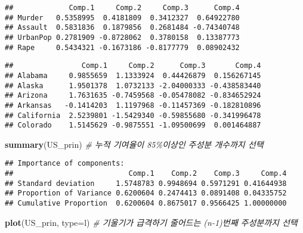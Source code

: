 \documentclass[
]{article}
\newenvironment{Shaded}{\begin{snugshade}}{\end{snugshade}}
\newcommand{\AttributeTok}[1]{\textcolor[rgb]{0.13,0.29,0.53}{#1}}
\newcommand{\CommentTok}[1]{\textcolor[rgb]{0.56,0.35,0.01}{\textit{#1}}}
\newcommand{\FunctionTok}[1]{\textcolor[rgb]{0.13,0.29,0.53}{\textbf{#1}}}
\newcommand{\NormalTok}[1]{#1}
\newcommand{\SpecialCharTok}[1]{\textcolor[rgb]{0.81,0.36,0.00}{\textbf{#1}}}
\newcommand{\StringTok}[1]{\textcolor[rgb]{0.31,0.60,0.02}{#1}}
\begin{document}
\begin{verbatim}
##             Comp.1     Comp.2     Comp.3      Comp.4
## Murder   0.5358995  0.4181809  0.3412327  0.64922780
## Assault  0.5831836  0.1879856  0.2681484 -0.74340748
## UrbanPop 0.2781909 -0.8728062  0.3780158  0.13387773
## Rape     0.5434321 -0.1673186 -0.8177779  0.08902432
\end{verbatim}

\begin{Shaded}
\end{Shaded}

\begin{verbatim}
##                Comp.1     Comp.2      Comp.3       Comp.4
## Alabama     0.9855659  1.1333924  0.44426879  0.156267145
## Alaska      1.9501378  1.0732133 -2.04000333 -0.438583440
## Arizona     1.7631635 -0.7459568 -0.05478082 -0.834652924
## Arkansas   -0.1414203  1.1197968 -0.11457369 -0.182810896
## California  2.5239801 -1.5429340 -0.59855680 -0.341996478
## Colorado    1.5145629 -0.9875551 -1.09500699  0.001464887
\end{verbatim}

\begin{Shaded}
\begin{Highlighting}[]
\FunctionTok{summary}\NormalTok{(US\_prin) }\CommentTok{\# 누적 기여율이 85\%이상인 주성분 개수까지 선택}
\end{Highlighting}
\end{Shaded}

\begin{verbatim}
## Importance of components:
##                           Comp.1    Comp.2    Comp.3     Comp.4
## Standard deviation     1.5748783 0.9948694 0.5971291 0.41644938
## Proportion of Variance 0.6200604 0.2474413 0.0891408 0.04335752
## Cumulative Proportion  0.6200604 0.8675017 0.9566425 1.00000000
\end{verbatim}

\begin{Shaded}
\begin{Highlighting}[]
\FunctionTok{plot}\NormalTok{(US\_prin, }\AttributeTok{type=}\StringTok{\textquotesingle{}l\textquotesingle{}}\NormalTok{) }\CommentTok{\# 기울기가 급격하기 줄어드는 (n{-}1)번째 주성분까지 선택}
\end{Highlighting}
\end{Shaded}
\end{document}
